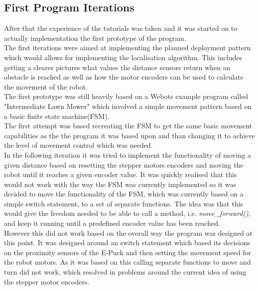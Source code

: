 \subsection{First Program Iterations}
\label{first_iteration}
After that the experience of the tutorials was taken and it was started on to actually implementation the first prototype of the program. \\
The first iterations were aimed at implementing the planned deployment pattern which would allows for implementing the localisation algorithm.  This includes getting a clearer pictures what values the distance sensors return when an obstacle is reached as well as how the motor encoders can be used to calculate the movement of the robot.\\
The first prototype was still heavily based on a Webots example program called "Intermediate Lawn Mower" which involved a simple movement pattern based on a basic finite state machine(FSM). \\
The first attempt was based recreating the FSM to get the same basic movement capabilities as the the program it was based upon and than changing it to achieve the level of movement control which was needed. \\[3ex]

In the following iteration it was tried to implement the functionality of moving a given distance based on resetting the stepper motors encoders and moving the robot until it reaches a given encoder value. It was quickly realised that this would not work with the way the FSM was currently implemented so it was decided to move the functionality of the FSM, which was currently based on a simple switch statement, to a set of separate functions. The idea was that this would give the freedom needed to be able to call a method, i.e. \textit{move\_forward()},  and keep it running until a predefined encoder value has been reached. \\
However this did not work based on the overall way the program was designed at this point. It was designed around an switch statement which based its decisions on the proximity sensors of the E-Puck and then setting the movement speed for the robot motors. As it was based on this calling separate functions to move and turn did not work, which resolved in problems around the current idea of using the stepper motor encoders. \\[3ex]

